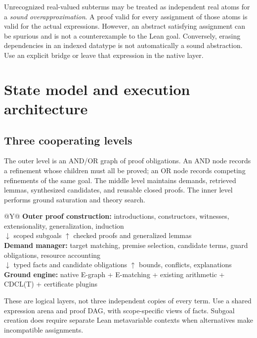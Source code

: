\documentclass[11pt,letterpaper]{article}
\theoremstyle{definition}\newtheorem{definition}[proposition]{Definition}
\begin{document}
Unrecognized real-valued subterms may be treated as independent real atoms for a \emph{sound overapproximation}. A proof valid for every assignment of those atoms is valid for the actual expressions. However, an abstract satisfying assignment can be spurious and is not a counterexample to the Lean goal. Conversely, erasing dependencies in an indexed datatype is not automatically a sound abstraction. Use an explicit bridge or leave that expression in the native layer.

\section{State model and execution architecture}
\label{sec:architecture}
\subsection{Three cooperating levels}
The outer level is an AND/OR graph of proof obligations. An AND node records a refinement whose children must all be proved; an OR node records competing refinements of the same goal. The middle level maintains demands, retrieved lemmas, synthesized candidates, and reusable closed proofs. The inner level performs ground saturation and theory search.

\begin{center}
\begin{tabularx}{\textwidth}{@{}Y@{}}
\toprule
\textbf{Outer proof construction:} introductions, constructors, witnesses, extensionality, generalization, induction \\
$\downarrow$ scoped subgoals \hfill $\uparrow$ checked proofs and generalized lemmas \\
\textbf{Demand manager:} target matching, premise selection, candidate terms, guard obligations, resource accounting \\
$\downarrow$ typed facts and candidate obligations \hfill $\uparrow$ bounds, conflicts, explanations \\
\textbf{Ground engine:} native E-graph + E-matching + existing arithmetic + CDCL(T) + certificate plugins \\
\bottomrule
\end{tabularx}
\end{center}

These are logical layers, not three independent copies of every term. Use a shared expression arena and proof DAG, with scope-specific views of facts. Subgoal creation does require separate Lean metavariable contexts when alternatives make incompatible assignments.
\end{document}
